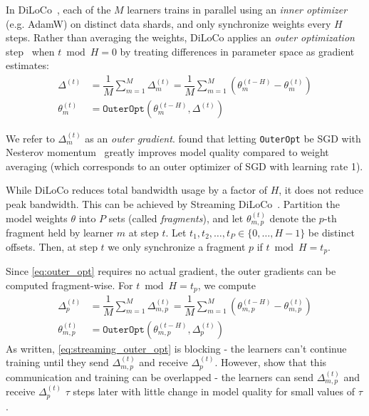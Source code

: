\documentclass[11pt, a4paper, twocolumn, copyright, google]{google}
\begin{document}
In DiLoCo~\citep{douillard2024diloco}, each of the $M$ learners trains in parallel using an \emph{inner optimizer} (e.g. AdamW) on distinct data shards, and only synchronize weights every $H$ steps. Rather than averaging the weights, DiLoCo applies an \emph{outer optimization} step~\citep{reddi2021adaptive} when $t \bmod H = 0$ by treating differences in parameter space as gradient estimates:
\begin{equation}\label{eq:outer_opt}
\begin{aligned}
    \Delta^{(t)} &= \dfrac{1}{M}\sum_{m=1}^M \Delta_m^{(t)} = \dfrac{1}{M}\sum_{m=1}^M\left(\theta_m^{(t - H)} - \theta_m^{(t)}\right) \\
    \theta^{(t)}_m &= \texttt{OuterOpt}(\theta^{(t-H)}_m, \Delta^{(t)})
\end{aligned}
\end{equation}

We refer to $\Delta_m^{(t)}$ as an \emph{outer gradient}. \citet{douillard2024diloco} found that letting \texttt{OuterOpt} be SGD with Nesterov momentum~\citep{sutskever2013nesterov} greatly improves model quality compared to weight averaging (which corresponds to an outer optimizer of SGD with learning rate 1).

While DiLoCo reduces total bandwidth usage by a factor of $H$, it does not reduce peak bandwidth. This can be achieved by Streaming DiLoCo~\citep{douillard2025streaming}. Partition the model weights $\theta$ into $P$ sets (called \emph{fragments}), and let $\theta_{m, p}^{(t)}$ denote the $p$-th fragment held by learner $m$ at step $t$. Let $t_1, t_2, \dots, t_P \in \{0, \dots, H-1\}$ be distinct offsets. Then, at step $t$ we only synchronize a fragment $p$ if $t\bmod H = t_p$.

Since \eqref{eq:outer_opt} requires no actual gradient, the outer gradients can be computed fragment-wise. For $t \bmod H = t_p$, we compute
\begin{equation}\label{eq:streaming_outer_opt}
\begin{aligned}
    \Delta^{(t)}_p &= \dfrac{1}{M}\sum_{m=1}^M \Delta_{m, p}^{(t)} = \dfrac{1}{M}\sum_{m=1}^M\left(\theta_{m, p}^{(t - H)} - \theta_{m, p}^{(t)}\right) \\
    \theta^{(t)}_{m, p} &= \texttt{OuterOpt}(\theta^{(t-H)}_{m, p}, \Delta^{(t)}_p)
\end{aligned}
\end{equation}
As written, \eqref{eq:streaming_outer_opt} is blocking - the learners can't continue training until they send $\Delta_{m, p}^{(t)}$ and receive $\Delta_p^{(t)}$. However, \citet{douillard2025streaming} show that this communication and training can be overlapped - the learners can send $\Delta_{m, p}^{(t)}$ and receive $\Delta_p^{(t)}$ $\tau$ steps later with little change in model quality for small values of $\tau$.
\end{document}
